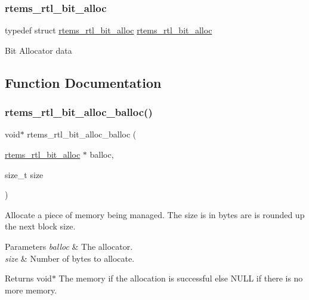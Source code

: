 \subsubsection{\texorpdfstring{rtems\_rtl\_bit\_alloc}{rtems\_rtl\_bit\_alloc}}
{\footnotesize\ttfamily typedef struct \mbox{\hyperlink{structrtems__rtl__bit__alloc}{rtems\+\_\+rtl\+\_\+bit\+\_\+alloc}}  \mbox{\hyperlink{structrtems__rtl__bit__alloc}{rtems\+\_\+rtl\+\_\+bit\+\_\+alloc}}}

Bit Allocator data 

\subsection{Function Documentation}
\mbox{\label{rtl-bit-alloc_8h_a4efbf95039225f1c361636877a9df6b3}} 
\subsubsection{\texorpdfstring{rtems\_rtl\_bit\_alloc\_balloc()}{rtems\_rtl\_bit\_alloc\_balloc()}}
{\footnotesize\ttfamily void$\ast$ rtems\+\_\+rtl\+\_\+bit\+\_\+alloc\+\_\+balloc (\begin{DoxyParamCaption}\item[{\mbox{\hyperlink{structrtems__rtl__bit__alloc}{rtems\+\_\+rtl\+\_\+bit\+\_\+alloc}} $\ast$}]{balloc,  }\item[{size\+\_\+t}]{size }\end{DoxyParamCaption})}

Allocate a piece of memory being managed. The size is in bytes are is rounded up the next block size.


\begin{DoxyParams}{Parameters}
{\em balloc} & The allocator. \\
\hline
{\em size} & Number of bytes to allocate. \\
\hline
\end{DoxyParams}
\begin{DoxyReturn}{Returns}
void$\ast$ The memory if the allocation is successful else N\+U\+LL if there is no more memory. 
\end{DoxyReturn}
\mbox{\label{rtl-bit-alloc_8h_aa895314e00bf91d5561c34e032f3ff58}} 
